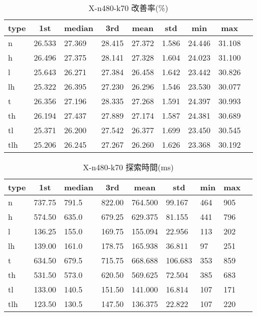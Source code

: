 \begin{table}[htbp]
    \centering
    \caption{X-n480-k70 改善率(\%)}
    \begin{tabular}{|l|l|l|l|l|l|l|l|l|}\hline
    \multicolumn{1}{|c|}{\textbf{type}}
    &\multicolumn{1}{|c|}{\textbf{1st}}
    &\multicolumn{1}{c|}{\textbf{median}}
    &\multicolumn{1}{c|}{\textbf{3rd}}
    &\multicolumn{1}{c|}{\textbf{mean}}
    &\multicolumn{1}{c|}{\textbf{std}}
    &\multicolumn{1}{c|}{\textbf{min}}
    &\multicolumn{1}{c|}{\textbf{max}}\\\hline
	n & 26.533 & 27.369 & 28.415 & 27.372 & 1.586 & 24.446 & 31.108\\\hline
	h & 26.496 & 27.375 & 28.141 & 27.328 & 1.604 & 24.023 & 31.100\\\hline
	l & 25.643 & 26.271 & 27.384 & 26.458 & 1.642 & 23.442 & 30.826\\\hline
	lh & 25.322 & 26.395 & 27.230 & 26.296 & 1.546 & 23.530 & 30.077\\\hline
	t & 26.356 & 27.196 & 28.335 & 27.268 & 1.591 & 24.397 & 30.993\\\hline
	th & 26.194 & 27.437 & 27.889 & 27.174 & 1.587 & 24.381 & 30.689\\\hline
	tl & 25.371 & 26.200 & 27.542 & 26.377 & 1.699 & 23.450 & 30.545\\\hline
	tlh & 25.206 & 26.245 & 27.267 & 26.260 & 1.626 & 23.368 & 30.192\\\hline
	\end{tabular}
\end{table}
\begin{table}[htbp]
    \centering
    \caption{X-n480-k70 探索時間(ms)}
    \begin{tabular}{|l|l|l|l|l|l|l|l|l|}\hline
    \multicolumn{1}{|c|}{\textbf{type}}
    &\multicolumn{1}{|c|}{\textbf{1st}}
    &\multicolumn{1}{c|}{\textbf{median}}
    &\multicolumn{1}{c|}{\textbf{3rd}}
    &\multicolumn{1}{c|}{\textbf{mean}}
    &\multicolumn{1}{c|}{\textbf{std}}
    &\multicolumn{1}{c|}{\textbf{min}}
    &\multicolumn{1}{c|}{\textbf{max}}\\\hline
	n & 737.75 & 791.5 & 822.00 & 764.500 & 99.167 & 464 & 905\\\hline
	h & 574.50 & 635.0 & 679.25 & 629.375 & 81.155 & 441 & 796\\\hline
	l & 136.25 & 155.0 & 169.75 & 155.094 & 22.956 & 113 & 202\\\hline
	lh & 139.00 & 161.0 & 178.75 & 165.938 & 36.811 & 97 & 251\\\hline
	t & 634.50 & 679.5 & 715.75 & 668.688 & 106.683 & 353 & 859\\\hline
	th & 531.50 & 573.0 & 620.50 & 569.625 & 72.504 & 385 & 683\\\hline
	tl & 133.00 & 140.5 & 151.50 & 141.000 & 16.814 & 107 & 171\\\hline
	tlh & 123.50 & 130.5 & 147.50 & 136.375 & 22.822 & 107 & 220\\\hline
	\end{tabular}
\end{table}
